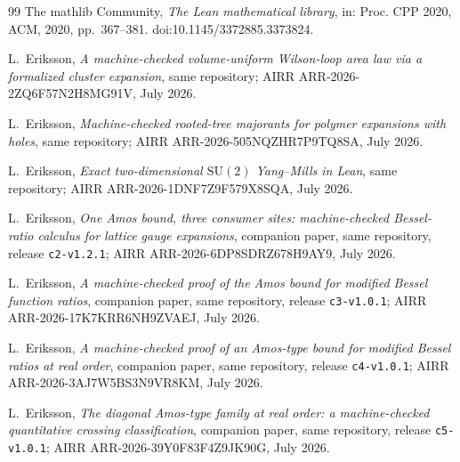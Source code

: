 \documentclass[11pt]{article}
\theoremstyle{definition}
\newcommand{\lean}[1]{\texttt{#1}}
\newcommand{\SU}{\mathrm{SU}}
\begin{document}
\begin{thebibliography}{99}
 The mathlib Community,
\emph{The Lean mathematical library}, in: Proc. CPP 2020, ACM, 2020,
pp.~367--381. doi:10.1145/3372885.3373824.

 L.~Eriksson,
\emph{A machine-checked volume-uniform Wilson-loop area law via a
formalized cluster expansion}, same repository;
AIRR ARR-2026-2ZQ6F57N2H8MG91V, July 2026.

 L.~Eriksson,
\emph{Machine-checked rooted-tree majorants for polymer expansions
with holes}, same repository; AIRR ARR-2026-505NQZHR7P9TQ8SA, July 2026.

 L.~Eriksson,
\emph{Exact two-dimensional $\SU(2)$ Yang--Mills in Lean}, same
repository; AIRR ARR-2026-1DNF7Z9F579X8SQA, July 2026.

 L.~Eriksson,
\emph{One Amos bound, three consumer sites: machine-checked
Bessel-ratio calculus for lattice gauge expansions}, companion paper,
same repository, release \lean{c2-v1.2.1};
AIRR ARR-2026-6DP8SDRZ678H9AY9, July 2026.

 L.~Eriksson,
\emph{A machine-checked proof of the Amos bound for modified Bessel
function ratios}, companion paper, same repository, release
\lean{c3-v1.0.1}; AIRR ARR-2026-17K7KRR6NH9ZVAEJ, July 2026.

 L.~Eriksson,
\emph{A machine-checked proof of an Amos-type bound for modified
Bessel ratios at real order}, companion paper, same repository,
release \lean{c4-v1.0.1}; AIRR ARR-2026-3AJ7W5BS3N9VR8KM, July 2026.

 L.~Eriksson,
\emph{The diagonal Amos-type family at real order: a machine-checked
quantitative crossing classification}, companion paper, same
repository, release \lean{c5-v1.0.1};
AIRR ARR-2026-39Y0F83F4Z9JK90G, July 2026.

\end{thebibliography}
\end{document}
